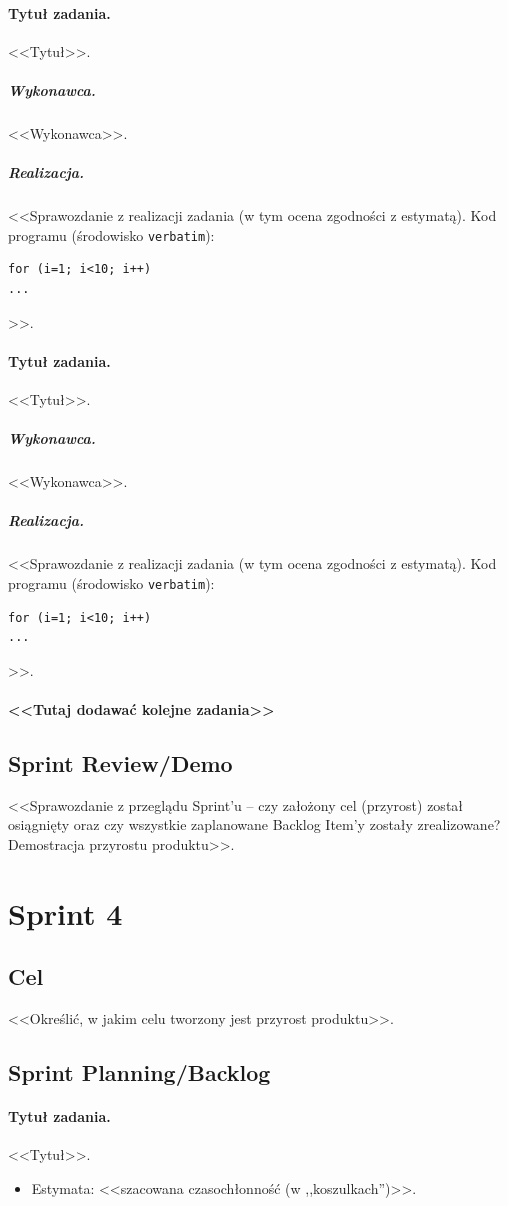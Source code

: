 \documentclass[a4paper]{article}
\begin{document}
\paragraph{Tytuł zadania.} <<Tytuł>>.
\subparagraph{Wykonawca.} <<Wykonawca>>.
\subparagraph{Realizacja.} <<Sprawozdanie z realizacji zadania (w tym ocena zgodności z estymatą). Kod programu (środowisko \texttt{verbatim}): \begin{verbatim}
for (i=1; i<10; i++)
...
\end{verbatim}>>.

\paragraph{Tytuł zadania.} <<Tytuł>>.
\subparagraph{Wykonawca.} <<Wykonawca>>.
\subparagraph{Realizacja.} <<Sprawozdanie z realizacji zadania (w tym ocena zgodności z estymatą). Kod programu (środowisko \texttt{verbatim}): \begin{verbatim}
for (i=1; i<10; i++)
...
\end{verbatim}>>.

\paragraph{<<Tutaj dodawać kolejne zadania>>}


\subsection{Sprint Review/Demo}
<<Sprawozdanie z przeglądu Sprint'u -- czy założony cel (przyrost) został osiągnięty oraz czy wszystkie zaplanowane Backlog Item'y zostały zrealizowane? Demostracja przyrostu produktu>>.


\section{Sprint 4}

\subsection{Cel} <<Określić, w jakim celu tworzony jest przyrost produktu>>.

\subsection{Sprint Planning/Backlog}

\paragraph{Tytuł zadania.} <<Tytuł>>.
\begin{itemize}
\item Estymata: <<szacowana czasochłonność (w ,,koszulkach'')>>.
\end{itemize}
\end{document}
